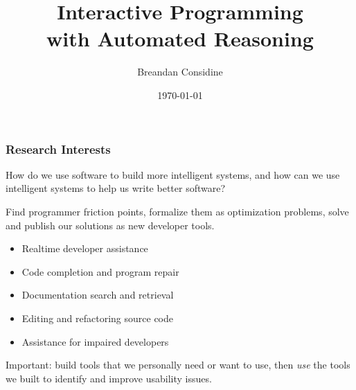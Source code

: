 \documentclass[mathserif,notheorems]{beamer}
\title{Interactive Programming\\ with Automated Reasoning}
\author{Breandan Considine}
\institute[McGill]{
  McGill University \\
  \medskip
  \textit{breandan.considine@mail.mcgill.ca}
}
\date{\today}
\theoremstyle{plain} %
\theoremstyle{definition} %
\begin{document}
\begin{frame}
  \titlepage
\end{frame}


\begin{frame}
  \frametitle{Research Interests}
  How do we use software to build more intelligent systems, and how can we use intelligent systems to help us write better software?\vspace{10pt}

  Find programmer friction points, formalize them as optimization problems, solve and publish our solutions as new developer tools.

  \vspace{10pt}
  \begin{itemize}
    \item Realtime developer assistance
    \item Code completion and program repair
    \item Documentation search and retrieval
    \item Editing and refactoring source code
    \item Assistance for impaired developers
  \end{itemize}
  \vspace{10pt}

  Important: build tools that we personally need or want to use, then \textit{use} the tools we built to identify and improve usability issues.
\end{frame}
\end{document}
